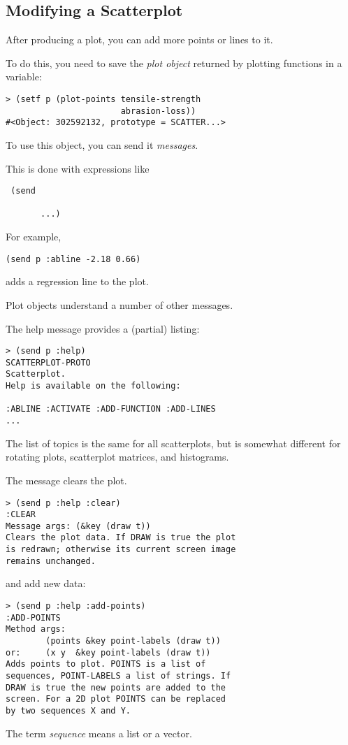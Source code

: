 \begin{slide}{}
\subsection{Modifying a Scatterplot}
After producing a plot, you can add more points or lines to it.

To do this, you need to save the {\em plot object}\/ returned by
plotting functions in a variable:
{\Large
\begin{verbatim}
> (setf p (plot-points tensile-strength
                       abrasion-loss))
#<Object: 302592132, prototype = SCATTER...>
\end{verbatim}}
To use this object, you can send it {\em messages}.

This is done with expressions like
\begin{flushleft}\Large\tt
(send~\\
~~~~~~\\
~~~~~~ ...)
\end{flushleft}
For example,
\begin{verbatim}
(send p :abline -2.18 0.66)
\end{verbatim}
adds a regression line to the plot.
\end{slide}

\begin{slide}{}
Plot objects understand a number of other messages.

The help message provides a (partial) listing:
{\Large
\begin{verbatim}
> (send p :help)
SCATTERPLOT-PROTO
Scatterplot.
Help is available on the following:

:ABLINE :ACTIVATE :ADD-FUNCTION :ADD-LINES
...
\end{verbatim}}
The list of topics is the same for all scatterplots, but is somewhat
different for rotating plots, scatterplot matrices, and histograms.
\end{slide}

\begin{slide}{}
The  message clears the plot.
{\Large
\begin{verbatim}
> (send p :help :clear)
:CLEAR
Message args: (&key (draw t))
Clears the plot data. If DRAW is true the plot
is redrawn; otherwise its current screen image
remains unchanged.
\end{verbatim}}
 and  add new data:
{\Large
\begin{verbatim}
> (send p :help :add-points)
:ADD-POINTS
Method args:
        (points &key point-labels (draw t))
or:     (x y  &key point-labels (draw t))
Adds points to plot. POINTS is a list of
sequences, POINT-LABELS a list of strings. If
DRAW is true the new points are added to the
screen. For a 2D plot POINTS can be replaced
by two sequences X and Y.
\end{verbatim}}
The term {\em sequence}\/ means a list or a vector.
\end{slide}

